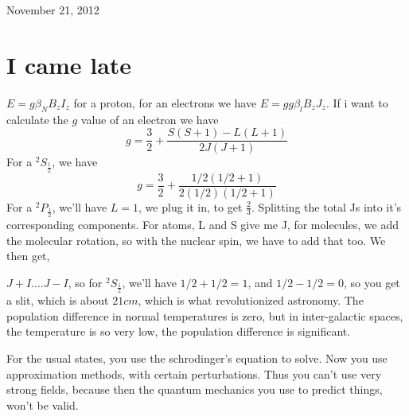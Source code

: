 \begin{flushright}
November 21, 2012
\end{flushright}
\section{I came late}
	$E=g\beta_NB_zI_z$ for a proton, for an electrons we have $E=gg\beta_lB_zJ_z$. If i want to calculate the $g$ value of an electron we have 
	\begin{equation}
		g=\frac{3}{2} + \frac{S(S+1)-L(L+1)}{2J(J+1)}
	\end{equation}
	For a $^2S_\frac{1}{2}$, we have 
	\begin{equation}
		g=\frac{3}{2} + \frac{1/2(1/2 + 1)}{2(1/2)(1/2 + 1)}
	\end{equation}
	For a $^2P_\frac{1}{2}$, we'll have $L=1$, we plug it in, to get $\frac{2}{3}$.
	Splitting the total Js into it's corresponding components. For atoms, L and S give me J, for molecules, we add the molecular rotation, so with the nuclear spin, we have to add that too.
	We then get,
	\par
		$J+I .... J-I$, so for $^2S_\frac{1}{2}$, we'll have $1/2 + 1/2 = 1$, and $1/2 - 1/2 = 0$, so you get a slit, which is about $21 cm$, which is what revolutionized astronomy. The population difference in normal temperatures is zero, but in inter-galactic spaces, the temperature is so very low, the population difference is significant.


	\par
	For the usual states, you use the schrodinger's equation to solve. Now you use approximation methods, with certain perturbations. Thus you can't use very strong fields, because then the quantum mechanics you use to predict things, won't be valid.

